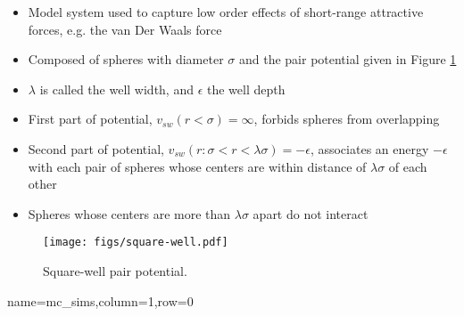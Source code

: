 \documentclass[paperwidth=48in,paperheight=36in,
fontscale=0.27,margin=0.75in]{baposter}
\newcommand{\p}[1]{\left(#1\right)} %
\begin{document}
\begin{poster}
{    %

    \begin{itemize}
    \item Model system used to capture low order effects of
      short-range attractive forces, e.g. the van Der Waals force
    \item Composed of spheres with diameter $\sigma$ and the pair
      potential given in Figure \ref{fig:pair_potential}
    \item $\lambda$ is called the well width, and $\epsilon$ the well
      depth
    \item First part of potential, $v_{sw}\p{r<\sigma}=\infty$,
      forbids spheres from overlapping
    \item Second part of potential,
      $v_{sw}\p{r:\sigma<r<\lambda\sigma}=-\epsilon$, associates an
      energy $-\epsilon$ with each pair of spheres whose centers are
      within distance of $\lambda\sigma$ of each other
    \item Spheres whose centers are more than $\lambda\sigma$ apart do
      not interact
    \end{itemize}

    \begin{figure}[H]
      \centering
      \texttt{[image: figs/square-well.pdf]}
      \caption{Square-well pair potential.}
      \label{fig:pair_potential}
    \end{figure}

  }

  {name=mc_sims,column=1,row=0}{%



}
\end{poster}
\end{document}
